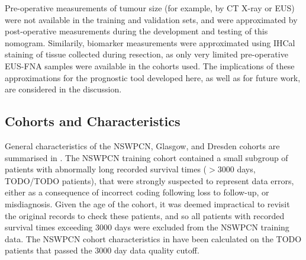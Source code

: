\documentclass[dissertation.tex]{subfiles}
\begin{document}
Pre-operative measurements of tumour size (for example, by \gls{CT} X-ray or \gls{EUS}) were not available in the training and validation sets, and were approximated by post-operative measurements during the development and testing of this nomogram.  Similarily, biomarker measurements were approximated using \gls{IHCal} staining of tissue collected during resection, as only very limited pre-operative \gls{EUS}-\gls{FNA} samples were available in the cohorts used.  The implications of these approximations for the prognostic tool developed here, as well as for future work, are considered in the discussion.  


\subsection{Cohorts and Characteristics}
General characteristics of the \gls{NSWPCN}, Glasgow, and Dresden cohorts are summarised in .  The \gls{NSWPCN} training cohort contained a small subgroup of patients with abnormally long recorded survival times ($> 3000$ days, TODO/TODO patients), that were strongly suspected to represent data errors, either as a consequence of incorrect coding following loss to follow-up, or misdiagnosis.  Given the age of the cohort, it was deemed impractical to revisit the original records to check these patients, and so all patients with recorded survival times exceeding 3000 days were excluded from the \gls{NSWPCN} training data.  The \gls{NSWPCN} cohort characteristics in  have been calculated on the TODO patients that passed the 3000 day data quality cutoff.
\end{document}
